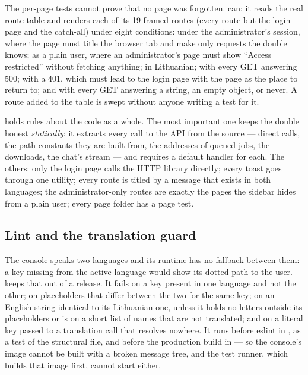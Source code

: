 The per-page tests cannot prove that no page was forgotten.
 can: it reads the real route table and renders
each of its 19 framed routes (every route but the login page and the catch-all) under eight
conditions: under the administrator's session, where the page must title the browser tab and
make only requests the double knows; as a plain user, where an administrator's page must show
\enquote{Access restricted} without fetching anything; in Lithuanian; with every GET answering
500; with a 401, which must lead to the login page with the page as the place to return to;
and with every GET answering a string, an empty object, or never. A route added to the table
is swept without anyone writing a test for it.

 holds rules about the code as a whole. The most
important one keeps the double honest \emph{statically}: it extracts every call to the API
from the source --- direct calls, the path constants they are built from, the addresses of
queued jobs, the downloads, the chat's stream --- and requires a default handler for each. The
others: only the login page calls the HTTP library directly; every toast goes through one
utility; every route is titled by a message that exists in both languages; the
administrator-only routes are exactly the pages the sidebar hides from a plain user; every
page folder has a page test.

\subsection{Lint and the translation guard}\label{sec:testing:console:lint}

The console speaks two languages and its runtime has no fallback between them: a key missing
from the active language would show its dotted path to the user.
 keeps that out of a release. It fails on a key present in one
language and not the other; on placeholders that differ between the two for the same key; on
an English string identical to its Lithuanian one, unless it holds no letters outside its
placeholders or is on a short list of names that are not translated; and on a literal key passed to a translation call that resolves nowhere.
It runs before eslint in , as a test of the structural file, and before the
production build in  --- so the console's image cannot be built with a
broken message tree, and the test runner, which builds that image first, cannot start either.


